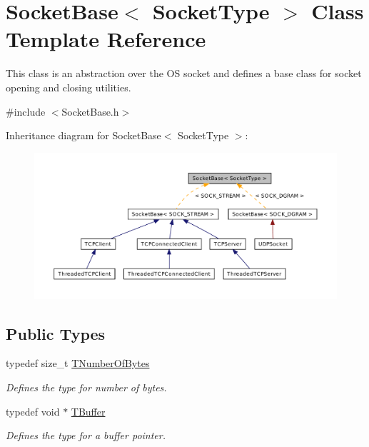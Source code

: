 \hypertarget{class_socket_base}{\section{Socket\-Base$<$ Socket\-Type $>$ Class Template Reference}
\label{class_socket_base}
}


This class is an abstraction over the O\-S socket and defines a base class for socket opening and closing utilities.  




{\ttfamily \#include $<$Socket\-Base.\-h$>$}



Inheritance diagram for Socket\-Base$<$ Socket\-Type $>$\-:\nopagebreak
\begin{figure}[H]
\begin{center}
\leavevmode
\includegraphics[width=350pt]{class_socket_base__inherit__graph}
\end{center}
\end{figure}
\subsection*{Public Types}
\begin{DoxyCompactItemize}
\item 
typedef size\-\_\-t \hyperlink{class_socket_base_ac414903631491453b96e71c06c2c2e72}{T\-Number\-Of\-Bytes}
\begin{DoxyCompactList}\small\item\em Defines the type for number of bytes. \end{DoxyCompactList}\item 
typedef void $\ast$ \hyperlink{class_socket_base_a1557d64029a25c20b4c306b80efcc143}{T\-Buffer}
\begin{DoxyCompactList}\small\item\em Defines the type for a buffer pointer. \end{DoxyCompactList}\end{DoxyCompactItemize}

